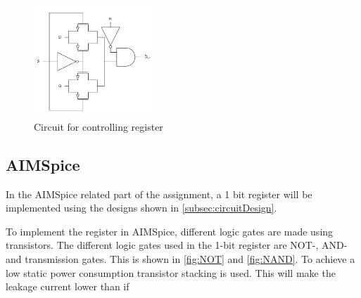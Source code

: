 \begin{figure}[H]
    \centering
    \includegraphics[width=0.4\textwidth]{Figures/setReset.png}
    \caption{Circuit for controlling register}
    \label{fig:setreset}
\end{figure}



\subsection{AIMSpice}
\label{subsec:aimspicemethod}
In the AIMSpice related part of the assignment, a 1 bit register will be implemented using the designs shown in \autoref{subsec:circuitDesign}. 

To implement the register in AIMSpice, different logic gates are made using transistors. The different logic gates used in the 1-bit register are NOT-, AND- and transmission gates. This is shown in \autoref{fig:NOT} and \ref{fig:NAND}. To achieve a low static power consumption transistor stacking is used. This will make the leakage current lower than if  

